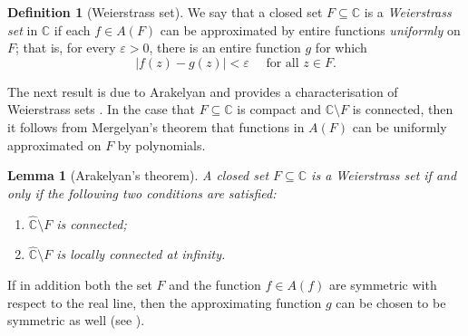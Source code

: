 \documentclass[a4paper, 12pt, reqno]{amsart}
\newcommand{\margin}[1]{\marginnote{\red{#1}}}
\numberwithin{equation}{section}
\newcommand{\red}[1]{{\color{red} #1}}
\theoremstyle{plain}
\newtheorem{lem}[thm]{Lemma}
\theoremstyle{definition}
\newtheorem{dfn}[thm]{Definition}
\theoremstyle{remark}
\newcommand{\C}{{\mathbb{C}}}
\newcommand{\CR}{{\hat{\mathbb{C}}}}
\begin{document}

\begin{dfn}[Weierstrass set]
\label{dfn:weierstrass-set}
We say that a closed set $F\subseteq\C $ is a \textit{Weierstrass set} in $\C$ if each $f\in A(F)$ can be approximated by entire functions \textit{uniformly} on $F$; that is, for every $\varepsilon>0$, there is an entire function $g$ for which
$$
|f(z)-g(z)|<\varepsilon\quad \mbox{ for all } z\in F.
$$
\end{dfn}

The next result is due to Arakelyan and provides a characterisation of Weierstrass sets \cite{arakeljan64}. In the case that $F\subseteq \C$ is compact and $\C\setminus F$ is connected, then it follows from Mergelyan's theorem \cite[Theorem~1~on~p.~97]{gaier87} that functions in $A(F)$ can be uniformly approximated on $F$ by polynomials.

\begin{lem}[Arakelyan's theorem]
A closed set $F\subseteq \C$ is a Weierstrass set if and only if the following two conditions are satisfied:
\begin{enumerate}
\item[\emph{(K$_1$)}] $\CR\setminus F$ is connected;
\item[\emph{(K$_2$)}] $\CR\setminus F$ is locally connected at infinity.
\end{enumerate}
\end{lem}


If in addition both the set $F$ and the function $f\in A(f)$ are symmetric with respect to the real line, then the approximating function $g$ can be chosen to be symmetric as well (see \cite[Section 2]{gauthier13}).
\end{document}
